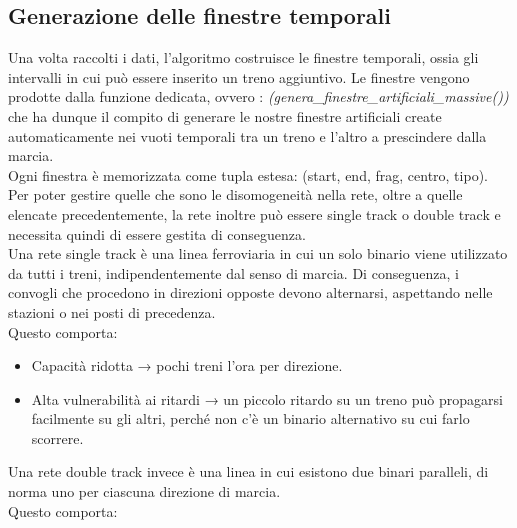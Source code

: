 \documentclass[a4paper,12pt]{report}
\begin{document}
\subsection{Generazione delle finestre temporali}
Una volta raccolti i dati, l’algoritmo costruisce le finestre temporali, ossia gli intervalli in cui può essere inserito un treno aggiuntivo.
Le finestre vengono prodotte dalla funzione dedicata, ovvero : 
\textit{(genera\_finestre\_artificiali\_massive())} che ha dunque il compito di generare le nostre finestre artificiali create automaticamente nei vuoti temporali tra un treno e l’altro a prescindere dalla marcia. \\ Ogni finestra è memorizzata come tupla estesa: (start, end, frag, centro, tipo). \\ Per poter gestire quelle che sono le disomogeneità nella rete, oltre a quelle elencate precedentemente, la rete inoltre può essere  single track o double track e necessita quindi di essere gestita di conseguenza. \\ Una rete single track è una linea ferroviaria in cui un solo binario viene utilizzato da tutti i treni, indipendentemente dal senso di marcia.
Di conseguenza, i convogli che procedono in direzioni opposte devono alternarsi, aspettando nelle stazioni o nei posti di precedenza.  \\ Questo comporta:


\begin{itemize}
    \item Capacità ridotta → pochi treni l’ora per direzione.


    \item Alta vulnerabilità ai ritardi → un piccolo ritardo su un treno può propagarsi facilmente su gli altri, perché non c’è un binario alternativo su cui farlo scorrere. \\ 
    \end{itemize}
    Una rete double track invece è una linea in cui esistono due binari paralleli, di norma uno per ciascuna direzione di marcia. \\    Questo comporta:
\end{document}
